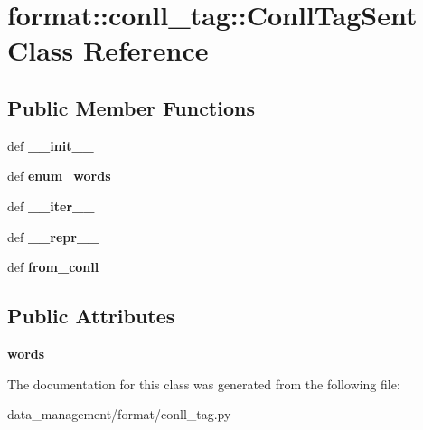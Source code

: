 \hypertarget{classformat_1_1conll__tag_1_1ConllTagSent}{
\section{format::conll\_\-tag::ConllTagSent Class Reference}
\label{classformat_1_1conll__tag_1_1ConllTagSent}
}
\subsection*{Public Member Functions}
\begin{DoxyCompactItemize}
\item 
\hypertarget{classformat_1_1conll__tag_1_1ConllTagSent_a4a3f6486d1726332f04158a7d178ac92}{
def {\bfseries \_\-\_\-init\_\-\_\-}}
\label{classformat_1_1conll__tag_1_1ConllTagSent_a4a3f6486d1726332f04158a7d178ac92}

\item 
\hypertarget{classformat_1_1conll__tag_1_1ConllTagSent_afa14cfd57d5ee6dfd90224e852e0c6b7}{
def {\bfseries enum\_\-words}}
\label{classformat_1_1conll__tag_1_1ConllTagSent_afa14cfd57d5ee6dfd90224e852e0c6b7}

\item 
\hypertarget{classformat_1_1conll__tag_1_1ConllTagSent_a0ef1ed7a5126744d3d53b19c07d4b7b9}{
def {\bfseries \_\-\_\-iter\_\-\_\-}}
\label{classformat_1_1conll__tag_1_1ConllTagSent_a0ef1ed7a5126744d3d53b19c07d4b7b9}

\item 
\hypertarget{classformat_1_1conll__tag_1_1ConllTagSent_a6055bbcfff581e8c60644e313f5f1a11}{
def {\bfseries \_\-\_\-repr\_\-\_\-}}
\label{classformat_1_1conll__tag_1_1ConllTagSent_a6055bbcfff581e8c60644e313f5f1a11}

\item 
\hypertarget{classformat_1_1conll__tag_1_1ConllTagSent_a00c45e00080833078b129e19e0cfa6c1}{
def {\bfseries from\_\-conll}}
\label{classformat_1_1conll__tag_1_1ConllTagSent_a00c45e00080833078b129e19e0cfa6c1}

\end{DoxyCompactItemize}
\subsection*{Public Attributes}
\begin{DoxyCompactItemize}
\item 
\hypertarget{classformat_1_1conll__tag_1_1ConllTagSent_aecfcc137bc56f86019f099e6187336a8}{
{\bfseries words}}
\label{classformat_1_1conll__tag_1_1ConllTagSent_aecfcc137bc56f86019f099e6187336a8}

\end{DoxyCompactItemize}


The documentation for this class was generated from the following file:\begin{DoxyCompactItemize}
\item 
data\_\-management/format/conll\_\-tag.py\end{DoxyCompactItemize}
